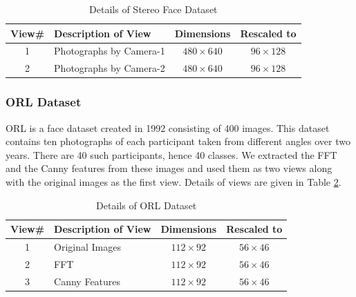 \begin{table}[h]
	\centering
	\caption{Details of Stereo Face Dataset}
	\label{tab:SF}
	\begin{tabular}{c l c c} \toprule
		
		\textbf{View\#} & \textbf{Description of View} & \textbf{Dimensions} & \textbf{Rescaled to} \\ \midrule
		1 & Photographs by Camera-1 & $480 \times 640$ & $96 \times 128$ \\ 
		2 & Photographs by Camera-2 & $480 \times 640$ & $96 \times 128$ \\ \bottomrule
			
	\end{tabular}
\end{table}




\subsubsection{ORL Dataset}
\hspace{0.8cm}ORL \cite{ATnT-ORL} is a face dataset created in 1992 consisting of 400 images. This dataset contains ten photographs of each participant taken from different angles over two years. There are 40 such participants, hence 40 classes. We extracted the FFT \cite{CooleyLW69} and the Canny \cite{Canny86} features from these images and used them as two views along with the original images as the first view. Details of views are given in Table \ref{tab:ORL}.

\begin{table}[h]
	\centering
	\caption{Details of ORL Dataset}
	\label{tab:ORL}
	\begin{tabular}{c l c c} \toprule
		
		\textbf{View\#} & \textbf{Description of View} & \textbf{Dimensions} & \textbf{Rescaled to} \\ \midrule
		1 & Original Images & $112 \times 92$ & $56 \times 46$ \\ 
		2 & FFT & $112 \times 92$ & $56 \times 46$ \\ 
		3 & Canny Features & $112 \times 92$ & $56 \times 46$ \\ \bottomrule
			
	\end{tabular}
\end{table}









\chapterend
\cleardoublepage